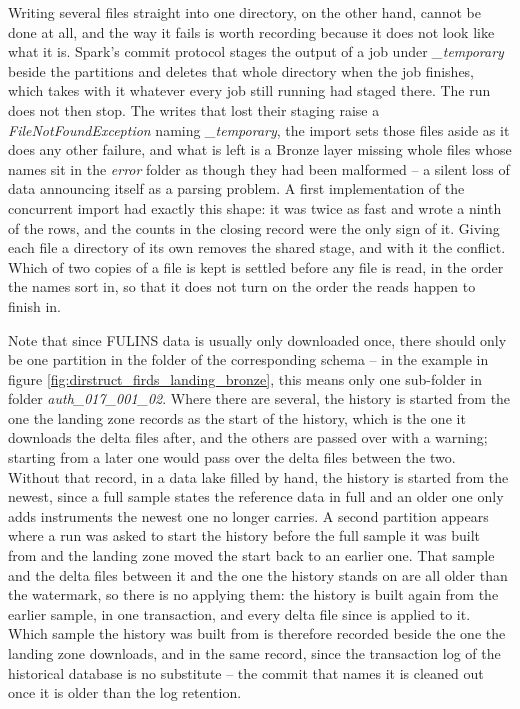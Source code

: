 Writing several files straight into one directory, on the other hand, cannot be done at all, and the way it fails is worth recording because it does not look like what it is. Spark's commit protocol stages the output of a job under \emph{\_temporary} beside the partitions and deletes that whole directory when the job finishes, which takes with it whatever every job still running had staged there. The run does not then stop. The writes that lost their staging raise a \emph{FileNotFoundException} naming \emph{\_temporary}, the import sets those files aside as it does any other failure, and what is left is a Bronze layer missing whole files whose names sit in the \emph{error} folder as though they had been malformed -- a silent loss of data announcing itself as a parsing problem. A first implementation of the concurrent import had exactly this shape: it was twice as fast and wrote a ninth of the rows, and the counts in the closing record were the only sign of it. Giving each file a directory of its own removes the shared stage, and with it the conflict. Which of two copies of a file is kept is settled before any file is read, in the order the names sort in, so that it does not turn on the order the reads happen to finish in.

Note that since FULINS data is usually only downloaded once, there should only be one partition in the folder of the corresponding schema -- in the example in figure \ref{fig:dirstruct_firds_landing_bronze}, this means only one sub-folder in folder \emph{auth\_017\_001\_02}. Where there are several, the history is started from the one the landing zone records as the start of the history, which is the one it downloads the delta files after, and the others are passed over with a warning; starting from a later one would pass over the delta files between the two. Without that record, in a data lake filled by hand, the history is started from the newest, since a full sample states the reference data in full and an older one only adds instruments the newest one no longer carries. A second partition appears where a run was asked to start the history before the full sample it was built from and the landing zone moved the start back to an earlier one. That sample and the delta files between it and the one the history stands on are all older than the watermark, so there is no applying them: the history is built again from the earlier sample, in one transaction, and every delta file since is applied to it. Which sample the history was built from is therefore recorded beside the one the landing zone downloads, and in the same record, since the transaction log of the historical database is no substitute -- the commit that names it is cleaned out once it is older than the log retention.

